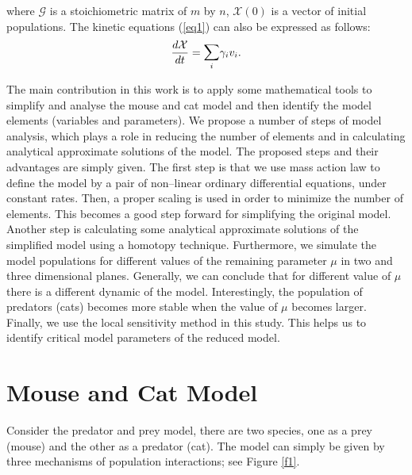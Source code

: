 \documentclass[a4paper,12pt]{article}
\begin{document}
\noindent where $\mathcal{G}$ is a stoichiometric matrix of $m$ by $n$, $\mathcal{X}(0)$ is a vector of initial populations. The kinetic equations (\ref{eq1}) can also be expressed as follows:
\begin{equation}
\begin{array}{llll}  
\dfrac{d\mathcal{X}}{dt}=\mathlarger{\mathlarger{\sum\limits}}_{i}\gamma_{i}v_{i} .
\end{array}
\label{eq1a} 
 \end{equation}  
 
 The main contribution in this work is to apply some mathematical tools to simplify and analyse the mouse and cat model and then identify the model elements (variables and parameters). We propose a number of steps of model analysis, which plays a role in reducing the number of elements and in calculating analytical approximate solutions of the model. The proposed steps and their advantages are simply given. The first step is that we use mass action law to define the model by a pair of non--linear ordinary differential equations, under constant rates. Then, a proper scaling is used in order to minimize the number of elements. This becomes a good step forward for simplifying the original model. Another step is calculating some analytical approximate solutions of the simplified model using a homotopy technique. Furthermore, we simulate the model populations for different values of the remaining parameter $\mu$ in two and three dimensional planes. Generally, we can conclude that for different value of $\mu$ there is a different dynamic of the model. Interestingly, the population of predators (cats) becomes more stable when the value of $\mu$ becomes larger. Finally, we use the local sensitivity
method in this study. This helps us to identify critical model parameters of the reduced model.

\section{Mouse and Cat Model} 
 Consider the predator and prey model, there are two species, one as a prey (mouse) and the other as a predator (cat). The model can simply be given by three mechanisms of population interactions; see Figure \ref{f1}.   
\end{document}
